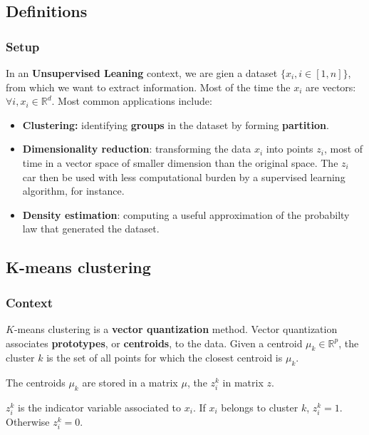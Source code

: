 \documentclass[
10pt, %
a4paper, %
oneside, %
headinclude,footinclude, %
BCOR5mm, %
]{scrartcl}
\begin{document}
\subsection{\large\color{MidnightBlue}Definitions}

\subsubsection{\large\color{Periwinkle}Setup}

In an \textbf{{Unsupervised Leaning}} context, we are gien a dataset $\{x_i, i\in [1,n]\}$, from which we want to extract information. Most of the time the $x_i$ are vectors: $\forall i, x_i\in \mathbb{R}^d$. Most common applications include:
\begin{itemize}
    \item \textbf{{Clustering:}} identifying \textbf{{groups}} in the dataset by forming  \textbf{{partition}}.
    \item \textbf{{Dimensionality reduction}}: transforming the data $x_i$ into points $z_i$, most of time in a vector space of smaller dimension than the original space. The $z_i$ car then be used with less computational burden by a supervised learning algorithm, for instance.
    \item \textbf{{Density estimation}}: computing a useful approximation of the probabilty law that generated the dataset.
\end{itemize}

\subsection{\large\color{MidnightBlue}K-means clustering}

\subsubsection{\large\color{Periwinkle}Context}

$K$-means clustering is a \textbf{{vector quantization}} method. Vector  quantization associates \textbf{{prototypes}}, or \textbf{{centroids}}, to the data. Given a centroid $\mu_k\in \mathbb{R}^p$, the cluster $k$ is the set of all points for which the closest centroid is $\mu_k$.

The centroids $\mu_k$ are stored in a matrix $\mu$, the $z_i^k$ in matrix $z$.

$z_i^k$ is the indicator variable associated to $x_i$. If $x_i$ belongs to cluster $k$, $z_i^k=1$. Otherwise $z_i^k=0$.
\end{document}
